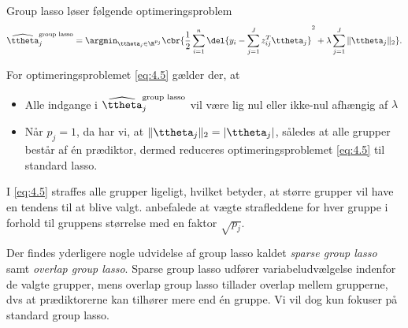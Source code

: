 \begin{defn}[Group lasso]
Group lasso løser følgende optimeringsproblem
\begin{align}
\widehat{\ttheta}_j^{\text{group lasso}} = \argmin_{\ttheta_j \in \R^{p_j}} \cbr{\frac{1}{2} \sum_{i=1}^n \del{y_i - \sum_{j=1}^J z_{ij}^T \ttheta_j}^2 + \lambda \sum_{j=1}^J \Vert \ttheta_j \Vert_2}. \label{eq:4.5}
\end{align}
\end{defn}
For optimeringsproblemet \eqref{eq:4.5} gælder der, at
\begin{itemize}
\item Alle indgange i $\widehat{\ttheta}_j^\text{group lasso}$ vil være lig nul eller ikke-nul afhængig af \(\lambda\)
\item Når $p_j=1$, da har vi, at $\Vert \ttheta_j \Vert_2 = \vert \ttheta_j \vert$, således at alle grupper består af én prædiktor, dermed reduceres optimeringsproblemet \eqref{eq:4.5} til standard lasso.
\end{itemize}
%
I \eqref{eq:4.5} straffes alle grupper ligeligt, hvilket betyder, at større grupper vil have en tendens til at blive valgt.
\citep{group_lasso} anbefalede at vægte strafleddene for hver gruppe i forhold til gruppens størrelse med en faktor \(\sqrt{p_j}\).

Der findes yderligere nogle udvidelse af group lasso kaldet \textit{sparse group lasso} samt \textit{overlap group lasso}.
Sparse group lasso udfører variabeludvælgelse indenfor de valgte grupper, mens overlap group lasso tillader overlap mellem grupperne, dvs at prædiktorerne kan tilhører mere end én gruppe.
Vi vil dog kun fokuser på standard group lasso.


